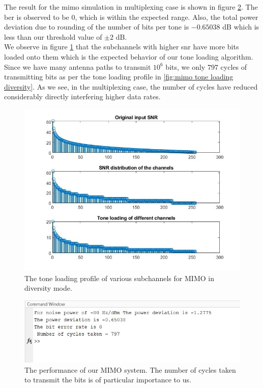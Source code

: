 The result for the \acrshort{mimo} simulation in multiplexing case is shown in figure \ref{fig:mimo system performance multiplexing}. The \acrshort{ber} is observed to be $0$, which is within the expected range. Also, the total power deviation due to rounding of the number of bits per tone is $-0.65038$ dB which is less than our threshold value of $\pm 2$ dB.\\
We observe in figure \ref{fig:mimo tone loading multiplexing} that the subchannels with higher \acrshort{snr} have more bits loaded onto them which is the expected behavior of our tone loading algorithm.\\
Since we have many antenna paths to transmit $10^6$ bits, we only $797$ cycles of transmitting bits as per the tone loading profile in \ref{fig:mimo tone loading diversity}. As we see, in the multiplexing case, the number of cycles have reduced considerably directly interfering higher data rates.

\begin{figure}[!htbp]
\centering
\includegraphics[scale=0.7]{Chapter 4/Figures/MIMO Tone Loading Multiplexing}
\caption[MIMO Tone Loading in Multiplexing Case]{The tone loading profile of various subchannels for MIMO in diversity mode.}
\label{fig:mimo tone loading multiplexing}
\end{figure}

\begin{figure}[!htbp]
\centering
\includegraphics[scale=1]{Chapter 4/Figures/MIMO System Performance Multiplexing}
\caption[MIMO System Performance in Multiplexing Case]{The performance of our MIMO system. The number of cycles taken to transmit the bits is of particular importance to us.}
\label{fig:mimo system performance multiplexing}
\end{figure}

